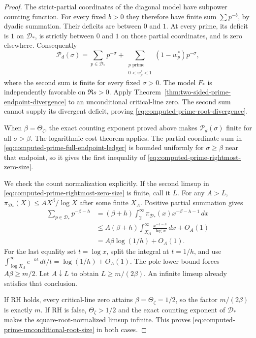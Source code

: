 \documentclass[11pt]{article}
\theoremstyle{definition}
\begin{document}
\begin{proof}
The strict-partial coordinates of the diagonal model have
subpower counting function. For every fixed $b>0$ they
therefore have finite sum $\sum p^{-b}$, by dyadic summation.
Their deficits are between $0$ and $1$.
At every prime, its deficit is $1$ on $\mathcal D_*$,
is strictly between $0$ and $1$ on those partial coordinates,
and is zero elsewhere. Consequently
\begin{equation}
 \mathcal P_d(\sigma)
      =\sum_{p\in\mathcal D_*}p^{-\sigma}
             +\sum_{\substack{p\text{ prime}\\0<w_p^*<1}}
                    (1-w_p^*)p^{-\sigma},
 \label{eq:computed-prime-full-endpoint-ledger}
\end{equation}
where the second sum is finite for every fixed $\sigma>0$.
The model $F_*$ is independently favorable on $\Re s>0$.
Apply Theorem~\ref{thm:two-sided-prime-endpoint-divergence}
to an unconditional critical-line zero. The second sum
cannot supply its divergent deficit, proving
\eqref{eq:computed-prime-root-divergence}.

When $\beta=\Theta_\zeta$, the exact counting exponent
proved above makes $\mathcal P_d(\sigma)$ finite for all
$\sigma>\beta$. The logarithmic cost theorem applies.
The partial-coordinate sum in
\eqref{eq:computed-prime-full-endpoint-ledger} is bounded
uniformly for $\sigma\ge\beta$ near that endpoint,
so it gives the first inequality of
\eqref{eq:computed-prime-rightmost-zero-size}.

We check the count normalization explicitly.
If the second limsup in
\eqref{eq:computed-prime-rightmost-zero-size} is finite, call
it $L$. For any $A>L$,
$\pi_{\mathcal D_*}(X)\le A X^\beta/\log X$ after some
finite $X_A$. Positive partial summation gives
\[
 \begin{aligned}
 \sum_{p\in\mathcal D_*}p^{-\beta-h}
   &=(\beta+h)\int_2^\infty
               \pi_{\mathcal D_*}(x)x^{-\beta-h-1}\,dx\\
   &\le A(\beta+h)\int_{X_A}^\infty
                           \frac{x^{-1-h}}{\log x}\,dx+O_A(1)\\
   &=A\beta\log(1/h)+O_A(1).
 \end{aligned}
\]
For the last equality set $t=\log x$, split the integral
at $t=1/h$, and use
$\int_{\log X_A}^\infty e^{-ht}\,dt/t=\log(1/h)+O_A(1)$.
The pole lower bound forces $A\beta\ge m/2$.
Let $A\downarrow L$ to obtain $L\ge m/(2\beta)$.
An infinite limsup already satisfies that conclusion.

If RH holds, every critical-line zero attains
$\beta=\Theta_\zeta=1/2$, so the factor $m/(2\beta)$ is
exactly $m$. If RH is false, $\Theta_\zeta>1/2$ and the
exact counting exponent of $\mathcal D_*$ makes the
square-root-normalized limsup infinite.
This proves \eqref{eq:computed-prime-unconditional-root-size}
in both cases.
\end{proof}
\end{document}
